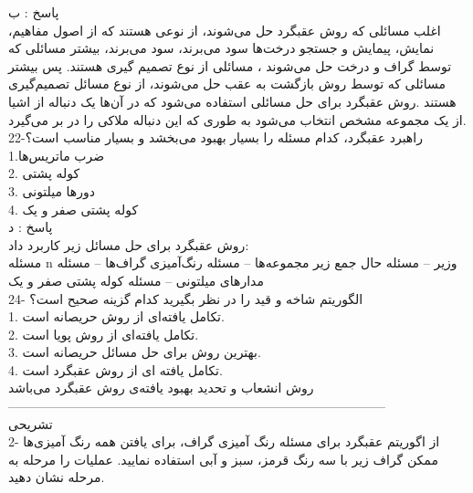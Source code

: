 \documentclass{book}
\begin{document}
پاسخ : ب\\
اغلب مسائلی که روش عقبگرد حل می‌شوند، از نوعی هستند که از اصول مفاهیم، نمایش، پیمایش و جستجو درخت‌ها سود می‌برند، سود می‌برند، بیشتر مسائلی که توسط گراف و درخت حل می‌شوند ، مسائلی از نوع تصمیم گیری هستند. پس بیشتر مسائلی که توسط روش بازگشت به عقب حل می‌شوند، از نوع مسائل تصمیم‌گیری هستند .روش عقبگرد برای حل مسائلی استفاده می‌شود که در آن‌ها یک دنباله از اشیا از یک مجموعه مشخص انتخاب می‌شود به طوری که این دنباله ملاکی را در بر می‌گیرد.\\

22-راهبرد عقبگرد، کدام مسئله را بسیار بهبود می‌بخشد و بسیار مناسب است؟\\
1.ضرب ماتریس‌ها\\
2. کوله پشتی\\
3. دورها میلتونی\\
4. کوله پشتی صفر و یک\\

پاسخ : د\\
روش عقبگرد برای حل مسائل زیر کاربرد داد:\\
مسئله n وزیر -- مسئله حال جمع زیر مجموعه‌ها -- مسئله رنگ‌آمیزی گراف‌ها -- مسئله مدارهای میلتونی -- مسئله کوله پشتی صفر و یک\\

24- الگوریتم شاخه و قید را در نظر بگیرید کدام گزینه صحیح است؟\\
1. تکامل یافته‌ای از روش حریصانه است.\\
2. تکامل یافته‌ای از روش پویا است.\\
3. بهترین روش برای حل مسائل حریصانه است.\\
4. تکامل یافته ای از روش عقبگرد است.\\

روش انشعاب و تحدید بهبود یافته‌ی روش عقبگرد می‌باشد\\

-----------------------------------------------------------------------------------------\\
تشریحی\\

2- از اگوریتم عقبگرد برای مسئله رنگ آمیزی گراف، برای یافتن همه رنگ آمیزی‌ها ممکن گراف زیر با سه رنگ قرمز، سبز و آبی استفاده نمایید. عملیات را مرحله به مرحله نشان دهید.\\

\]\\
\end{document}
